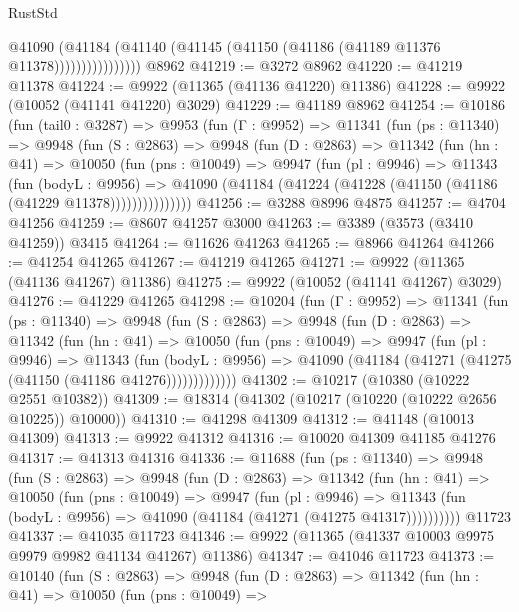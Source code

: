 \begin{lexlean}{RustStd}
\begin{coremodule}
                      @41090
                        (@41184
                          (@41140 (@41145 (@41150 (@41186 (@41189 @11376 @11378))))))))))))))))
    @8962
@41219 := @3272 @8962
@41220 := @41219 @11378
@41224 := @9922 (@11365 (@41136 @41220) @11386)
@41228 := @9922 (@10052 (@41141 @41220) @3029)
@41229 := @41189 @8962
@41254 := @10186
    (fun (tail0 : @3287) =>
    @9953
      (fun (Γ : @9952) =>
      @11341
        (fun (ps : @11340) =>
        @9948
          (fun (S : @2863) =>
          @9948
            (fun (D : @2863) =>
            @11342
              (fun (hn : @41) =>
              @10050
                (fun (pns : @10049) =>
                @9947
                  (fun (pl : @9946) =>
                  @11343
                    (fun (bodyL : @9956) =>
                    @41090 (@41184 (@41224 (@41228 (@41150 (@41186 (@41229 @11378)))))))))))))))
@41256 := @3288 @8996 @4875
@41257 := @4704 @41256
@41259 := @8607 @41257 @3000
@41263 := @3389 (@3573 (@3410 @41259)) @3415
@41264 := @11626 @41263
@41265 := @8966 @41264
@41266 := @41254 @41265
@41267 := @41219 @41265
@41271 := @9922 (@11365 (@41136 @41267) @11386)
@41275 := @9922 (@10052 (@41141 @41267) @3029)
@41276 := @41229 @41265
@41298 := @10204
    (fun (Γ : @9952) =>
    @11341
      (fun (ps : @11340) =>
      @9948
        (fun (S : @2863) =>
        @9948
          (fun (D : @2863) =>
          @11342
            (fun (hn : @41) =>
            @10050
              (fun (pns : @10049) =>
              @9947
                (fun (pl : @9946) =>
                @11343
                  (fun (bodyL : @9956) =>
                  @41090 (@41184 (@41271 (@41275 (@41150 (@41186 @41276)))))))))))))
@41302 := @10217 (@10380 (@10222 @2551 @10382))
@41309 := @18314 (@41302 (@10217 (@10220 (@10222 @2656 @10225)) @10000))
@41310 := @41298 @41309
@41312 := @41148 (@10013 @41309)
@41313 := @9922 @41312
@41316 := @10020 @41309 @41185 @41276
@41317 := @41313 @41316
@41336 := @11688
    (fun (ps : @11340) =>
    @9948
      (fun (S : @2863) =>
      @9948
        (fun (D : @2863) =>
        @11342
          (fun (hn : @41) =>
          @10050
            (fun (pns : @10049) =>
            @9947
              (fun (pl : @9946) =>
              @11343 (fun (bodyL : @9956) => @41090 (@41184 (@41271 (@41275 @41317))))))))))
    @11723
@41337 := @41035 @11723
@41346 := @9922 (@11365 (@41337 @10003 @9975 @9979 @9982 @41134 @41267) @11386)
@41347 := @41046 @11723
@41373 := @10140
    (fun (S : @2863) =>
    @9948
      (fun (D : @2863) =>
      @11342
        (fun (hn : @41) =>
        @10050
          (fun (pns : @10049) =>

\end{coremodule}
\end{lexlean}
